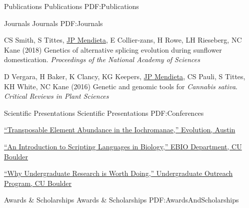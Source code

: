 \documentclass[letterpaper,MMMyyyy,nonstopmode]{simpleresumecv}
\begin{document}
\begin{Body}

\Section
{Publications}
{Publications}
{PDF:Publications}

\SubSection
{Journals}
{Journals}
{PDF:Journals}

\begingroup
\renewcommand{\MaxNumberedItem}{[300]}


\Gap
\NumberedItem{[2]}
{CS Smith, S Tittes, \underline{JP Mendieta}, E Collier-zans, H Rowe, LH  Rieseberg, NC Kane 
(2018)
Genetics of alternative splicing evolution during sunflower domestication.
\textit{Proceedings of the National Academy of Sciences}}

\Gap
\NumberedItem{[1]}
{D Vergara, H Baker, K Clancy, KG Keepers, \underline{JP Mendieta}, CS Pauli, S Tittes, KH White, NC Kane
(2016)
Genetic and genomic tools for \textit{Cannabis sativa}.
\textit{Critical Reviews in Plant Sciences}}

\endgroup

\BigGap
\SubSection
{Scientific Presentations}
{Scientific Presentations}
{PDF:Conferences}

\begingroup
\renewcommand{\MaxNumberedItem}{[8888]}


\Gap
\NumberedItem{[3]}
\href{http://www.example.com/my-paper-doi-1}
{
``Transposable Element Abundance in the Iochromanae,''
Evolution, Austin
}


\Gap
\NumberedItem{[2]}
\href{http://www.example.com/my-paper-doi-1}
{
``An Introduction to Scripting Languages in Biology,''
EBIO Department,
CU Boulder
}


\Gap
\NumberedItem{[1]}
\href{http://www.example.com/my-paper-doi-1}
{
``Why Undergraduate Research is Worth Doing,''
Undergraduate Outreach Program,
CU Boulder
}




\endgroup



\Section
{Awards \&\newline
Scholarships}
{Awards \& Scholarships}
{PDF:AwardsAndScholarships}



\end{Body}
\end{document}
